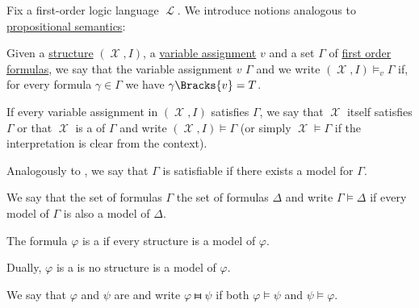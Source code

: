 \begin{definition}\label{def:first_order_semantics}\mcite\cite[208]{OpenLogic20201202}
  Fix a first-order logic language \( \mscrL \). We introduce notions analogous to \hyperref[def:propositional_semantics]{propositional semantics}:
  \begin{thmenum}
     Given a \hyperref[def:first_order_structure]{structure} \( (\mscrX, I) \), a \hyperref[def:first_order_valuation/variable_assignment]{variable assignment} \( v \) and a set \( \Gamma \) of \hyperref[def:first_order_syntax/formula]{first order formulas}, we say that the variable assignment \( v \)  \( \Gamma \) and we write \( (\mscrX, I) \vDash_v \Gamma \) if, for every formula \( \gamma \in \Gamma \) we have \( \gamma\Bracks{v} = T \).

    If every variable assignment in \( (\mscrX, I) \) satisfies \( \Gamma \), we say that \( \mscrX \) itself satisfies \( \Gamma \) or that \( \mscrX \) is a  of \( \Gamma \) and write \( (\mscrX, I) \vDash \Gamma \) (or simply \( \mscrX \vDash \Gamma \) if the interpretation is clear from the context).

    Analogously to , we say that \( \Gamma \) is satisfiable if there exists a model for \( \Gamma \).

     We say that the set of formulas \( \Gamma \)  the set of formulas \( \Delta \) and write \( \Gamma \vDash \Delta \) if every model of \( \Gamma \) is also a model of \( \Delta \).

     The formula \( \varphi \) is a  if every structure is a model of \( \varphi \).

     Dually, \( \varphi \) is a  is no structure is a model of \( \varphi \).

     We say that \( \varphi \) and \( \psi \) are  and write \( \varphi \gleichstark \psi \) if both \( \varphi \vDash \psi \) and \( \psi \vDash \varphi \).
  \end{thmenum}
\end{definition}

